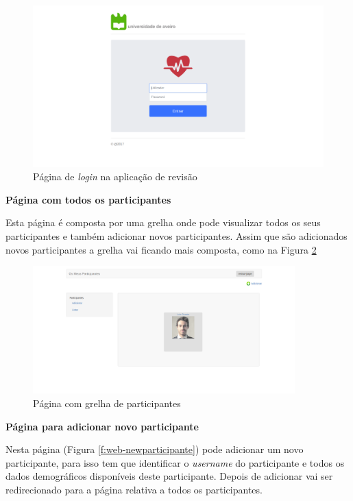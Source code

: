 \begin{figure}[H]
\centering
\includegraphics[width=1\textwidth]{imgs/login_web.png}
\caption[Página de \textit{login} na aplicação de revisão]{Página de \textit{login} na aplicação de revisão}
\label{f:web-login}
\end{figure}

\par
\textbf{Página com todos os participantes}
\par
Esta página é composta por uma grelha onde pode visualizar todos os seus participantes e também adicionar novos participantes. Assim que são adicionados novos participantes a grelha vai ficando mais composta, como na Figura \ref{f:gridParticipante}

\begin{figure}[H]
\centering
\includegraphics[width=0.9\textwidth]{imgs/list_after_add_web.png}
\caption[Página com grelha de participantes]{Página com grelha de participantes}
\label{f:gridParticipante}
\end{figure}


\par
\textbf{Página para adicionar novo participante}
\par
Nesta página (Figura \ref{f:web-newparticipante}) pode adicionar um novo participante, para isso tem que identificar o \textit{username} do participante e todos os dados demográficos disponíveis deste participante. Depois de adicionar vai ser redirecionado para a página relativa a todos os participantes. 

